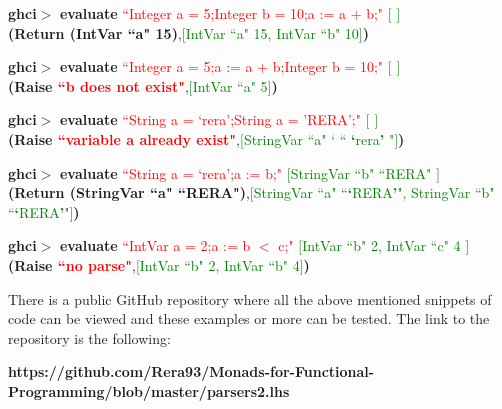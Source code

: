 \documentclass[a4paper, onecolumn]{article}
\begin{document}
    \begin{center}
            \textbf{ghci$>$} \textbf{evaluate} \textcolor{red}{``Integer a = 5;Integer b = 10;a := a + b;"} \textcolor{green}{ $\big[$ $\big]$} \\
             \textbf{(Return (IntVar ``a" 15)},\textcolor{green}{$\big[$IntVar ``a" 15, IntVar ``b" 10$\big]$}\textbf{)}
        \end{center}
        
        \begin{center}
            \textbf{ghci$>$} \textbf{evaluate} \textcolor{red}{``Integer a = 5;a := a + b;Integer b = 10;"} \textcolor{green}{ $\big[$ $\big]$} \\
             \textbf{(Raise \textcolor{red}{``b does not exist"}},\textcolor{green}{$\big[$IntVar ``a" 5$\big]$}\textbf{)}
        \end{center}
        
         \begin{center}
            \textbf{ghci$>$} \textbf{evaluate} \textcolor{red}{``String a = `rera';String a = 'RERA';"} \textcolor{green}{ $\big[$ $\big]$} \\
             \textbf{(Raise \textcolor{red}{``variable a already exist"}},\textcolor{green}{$\big[$StringVar ``a" ` `` \textbf{`}rera\textbf{'} "$\big]$}\textbf{)}
        \end{center}
    
    \begin{center}
            \textbf{ghci$>$} \textbf{evaluate} \textcolor{red}{``String a = `rera';a := b;"} \textcolor{green}{ $\big[$StringVar ``b" ``RERA" $\big]$} \\
             \textbf{(Return (StringVar ``a" ``RERA")},\textcolor{green}{$\big[$StringVar ``a" ``\textbf{`}RERA\textbf{'}", StringVar ``b" ``\textbf{`}RERA\textbf{'}"$\big]$}\textbf{)}
        \end{center}
        
        \begin{center}
            \textbf{ghci$>$} \textbf{evaluate} \textcolor{red}{``IntVar a = 2;a := b $<$ c;"} \textcolor{green}{ $\big[$IntVar ``b" 2, IntVar ``c" 4 $\big]$} \\
             \textbf{(Raise \textcolor{red}{``no parse"}},\textcolor{green}{$\big[$IntVar ``b" 2, IntVar ``b" 4$\big]$}\textbf{)}
        \end{center}
        
    \noindent There is a public GitHub repository where all the above mentioned snippets of code can be viewed and these examples or more can be tested. The link to the repository is the following:
    \begin{center}
        \textbf{https://github.com/Rera93/Monads-for-Functional-Programming/blob/master/parsers2.lhs}
    \end{center}
    
\end{document}
